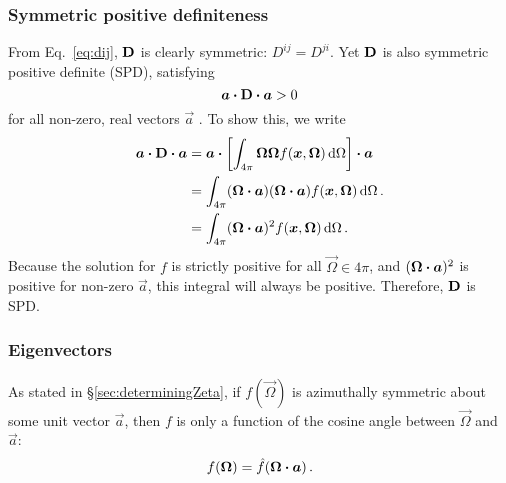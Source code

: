 \subsubsection{Symmetric positive definiteness}
From Eq.~\eqref{eq:dij}, $\mathbf{D}$ is clearly symmetric: $D^{ij}=D^{ji}$. Yet
$\mathbf{D}$ is also symmetric positive definite (SPD), satisfying
\begin{equation*}
  \bm{a} \bm{\cdot} \mathbf{D} \bm{\cdot} \bm{a} > 0
\end{equation*}
for all non-zero, real vectors $\vec{a}$ \cite{Tre1997}. To show this, we write 
\begin{align*}
  \bm{a} \bm{\cdot} \mathbf{D} \bm{\cdot} \bm{a} &=
  \bm{a} \bm{\cdot} \left[\int_{4\pi} \bm{\Omega} \bm{\Omega}
  f(\bm{x}, \bm{\Omega}) \mathop{}\!\mathrm{d}\Omega\right] \bm{\cdot} \bm{a}
  \\
  &=
  \int_{4\pi} (\bm{\Omega} \bm{\cdot}
  \bm{a}) (\bm{\Omega} \bm{\cdot} \bm{a})
  f(\bm{x}, \bm{\Omega}) \mathop{}\!\mathrm{d}\Omega\,.
  \\
  &=
  \int_{4\pi} (\bm{\Omega} \bm{\cdot} \bm{a})^2
  f(\bm{x}, \bm{\Omega}) \mathop{}\!\mathrm{d}\Omega\,.
\end{align*}
Because the solution for $f$ is strictly positive for all $\vec{\Omega}\in
4\pi$, and $(\bm{\Omega} \bm{\cdot} \bm{a})^2$ is positive for non-zero
$\vec{a}$, this integral will always be positive. Therefore, $\mathbf{D}$ is SPD.

\subsubsection{Eigenvectors}
As stated in \S\ref{sec:determiningZeta}, if $f(\vec{\Omega})$ is azimuthally
symmetric about some unit vector $\vec{a}$, then $f$ is only a function of the
cosine angle
between $\vec{\Omega}$ and $\vec{a}$:
\begin{equation*}
f(\bm{\Omega}) = \hat f( \bm{\Omega} \bm{\cdot} \bm{a})\,.
\end{equation*}

